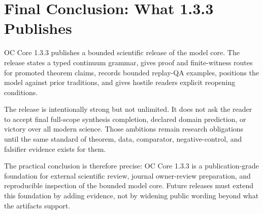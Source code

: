 \section{Final Conclusion: What 1.3.3 Publishes}

\label{sec:oc133-final-conclusion}

OC Core 1.3.3 publishes a bounded scientific release of the model core. The release states a typed continuum grammar, gives proof and finite-witness routes for promoted theorem claims, records bounded replay-QA examples, positions the model against prior traditions, and gives hostile readers explicit reopening conditions.


The release is intentionally strong but not unlimited. It does not ask the reader to accept final full-scope synthesis completion, declared domain prediction, or victory over all modern science. Those ambitions remain research obligations until the same standard of theorem, data, comparator, negative-control, and falsifier evidence exists for them.


The practical conclusion is therefore precise: OC Core 1.3.3 is a publication-grade foundation for external scientific review, journal owner-review preparation, and reproducible inspection of the bounded model core. Future releases must extend this foundation by adding evidence, not by widening public wording beyond what the artifacts support.
